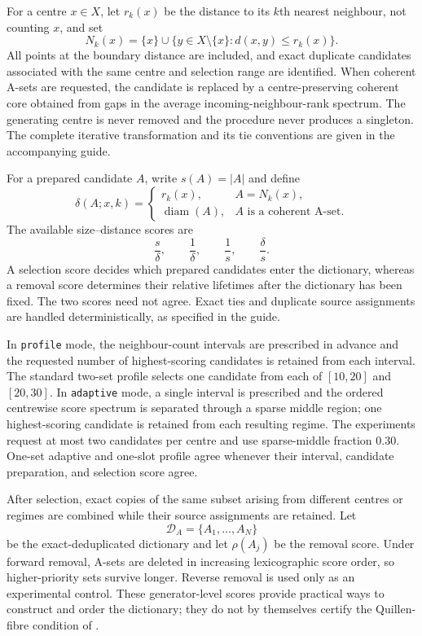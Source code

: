 \documentclass[a4paper,11pt]{article}
\theoremstyle{definition}
\theoremstyle{remark}
\begin{document}
For a centre $x\in X$, let $r_k(x)$ be the distance to its $k$th nearest neighbour, not counting $x$, and set
$$
N_k(x)=\{x\}\cup\{y\in X\setminus\{x\}\colon d(x,y)\leq r_k(x)\}.
$$
All points at the boundary distance are included, and exact duplicate candidates associated with the same centre and selection range are identified. When coherent A-sets are requested, the candidate is replaced by a centre-preserving coherent core obtained from gaps in the average incoming-neighbour-rank spectrum. The generating centre is never removed and the procedure never produces a singleton. The complete iterative transformation and its tie conventions are given in the accompanying guide.

For a prepared candidate $A$, write $s(A)=|A|$ and define
$$
\delta(A;x,k)=\begin{cases}r_k(x),&A=N_k(x),\\[1mm]\operatorname{diam}(A),&A\text{ is a coherent A-set}.
\end{cases}
$$
The available size--distance scores are
$$
\frac{s}{\delta},\qquad\frac1\delta,\qquad\frac1s,\qquad\frac{\delta}{s}.
$$
A selection score decides which prepared candidates enter the dictionary, whereas a removal score determines their relative lifetimes after the dictionary has been fixed. The two scores need not agree. Exact ties and duplicate source assignments are handled deterministically, as specified in the guide.

In \texttt{profile} mode, the neighbour-count intervals are prescribed in advance and the requested number of highest-scoring candidates is retained from each interval. The standard two-set profile selects one candidate from each of $[10,20]$ and $[20,30]$. In \texttt{adaptive} mode, a single interval is prescribed and the ordered centrewise score spectrum is separated through a sparse middle region; one highest-scoring candidate is retained from each resulting regime. The experiments request at most two candidates per centre and use sparse-middle fraction $0.30$. One-set adaptive and one-slot profile agree whenever their interval, candidate preparation, and selection score agree.

After selection, exact copies of the same subset arising from different centres or regimes are combined while their source assignments are retained. Let
$$
\mathcal D_A=\{A_1,\ldots,A_N\}
$$
be the exact-deduplicated dictionary and let $\rho(A_j)$ be the removal score. Under forward removal, A-sets are deleted in increasing lexicographic score order, so higher-priority sets survive longer. Reverse removal is used only as an experimental control. These generator-level scores provide practical ways to construct and order the dictionary; they do not by themselves certify the Quillen-fibre condition of .
\end{document}
